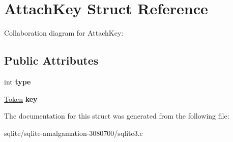 \hypertarget{struct_attach_key}{\section{Attach\+Key Struct Reference}
\label{struct_attach_key}
}


Collaboration diagram for Attach\+Key\+:
\subsection*{Public Attributes}
\begin{DoxyCompactItemize}
\item 
\hypertarget{struct_attach_key_acd780bfae7415a79a90fa5ceb41515cd}{int {\bfseries type}}\label{struct_attach_key_acd780bfae7415a79a90fa5ceb41515cd}

\item 
\hypertarget{struct_attach_key_a267449f11a142a3b88c54aa01f842ad0}{\hyperlink{struct_token}{Token} {\bfseries key}}\label{struct_attach_key_a267449f11a142a3b88c54aa01f842ad0}

\end{DoxyCompactItemize}


The documentation for this struct was generated from the following file\+:\begin{DoxyCompactItemize}
\item 
sqlite/sqlite-\/amalgamation-\/3080700/sqlite3.\+c\end{DoxyCompactItemize}
